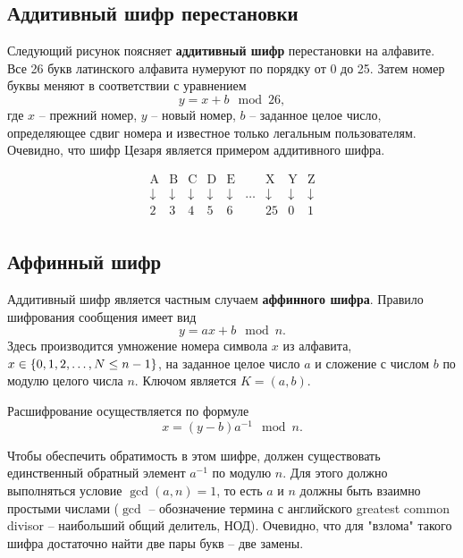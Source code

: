 \subsection{Аддитивный шифр перестановки}

Следующий рисунок
поясняет \textbf{аддитивный шифр} перестановки на алфавите. Все 26 букв латинского алфавита нумеруют по порядку от 0 до 25. Затем номер буквы меняют в соответствии с уравнением
    \[ y = x + b \mod 26, \]
где $x$ -- прежний номер, $y$ -- новый номер, $b$ -- заданное целое число, определяющее сдвиг номера и известное только легальным пользователям. Очевидно, что шифр Цезаря является примером аддитивного шифра.
  	
\[ \begin{array}{ccccccccc}
    \text{A} & \text{B} & \text{C} & \text{D} & \text{E} & & \text{X} & \text{Y} & \text{Z} \\
    \downarrow & \downarrow & \downarrow & \downarrow & \downarrow & \dots & \downarrow & \downarrow & \downarrow \\
    2 & 3 & 4 & 5 & 6 & & 25 & 0 & 1 \\
\end{array} \]


\subsection{Аффинный шифр}

Аддитивный шифр является частным случаем \textbf{аффинного шифра}. Правило шифрования сообщения имеет вид
    \[ y = a x + b \mod n. \]
Здесь производится умножение номера символа $x$ из алфавита, $x\in \mathbb{\{} 0, 1, 2, \dots, N \leq n-1 \}$, на заданное целое число $a$ и сложение с числом $b$ по модулю целого числа $n$. Ключом является $K = (a, b)$.

Расшифрование осуществляется по формуле
    \[ x = (y - b) a^{-1} \mod n. \]

Чтобы обеспечить обратимость в этом шифре, должен существовать единственный обратный элемент $a^{-1}$ по модулю $n$. Для этого должно выполняться условие $\gcd(a,n) = 1$, то есть $a$ и $n$ должны быть взаимно простыми числами ($\gcd$ -- обозначение термина с английского greatest common divisor -- наибольший общий делитель, $\text{НОД}$). Очевидно, что для "взлома" такого шифра достаточно найти две пары букв -- две замены.
